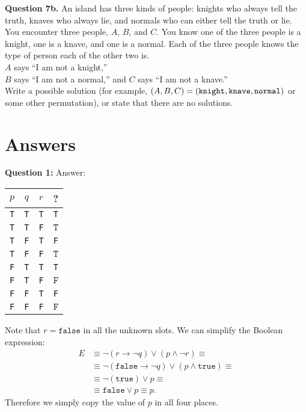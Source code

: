 \documentclass[jou]{apa6}
\begin{document}
\vspace{10pt}
{\bf Question 7b.} 
An island has three kinds of people: knights who always
tell the truth, knaves who always lie, and normals who can either tell the truth or lie. 
You encounter three people, $A$, $B$, and $C$. 
You know one of the three people is a knight, one is a knave, and one is a normal. Each of the three
people knows the type of person each of the other two is.\\
$A$ says ``I am not a knight,''\\
$B$ says ``I am not a normal,'' and 
$C$ says ``I am not a knave.''\\
Write a possible solution (for example, $(A,B,C)=({\tt knight},{\tt knave},{\tt normal})$ or 
some other permutation), or state that there are no solutions.


\newpage 

\section{Answers}


{\bf Question 1:} Answer:

\begin{tabular}{ c | c | c | c }
$p$ & $q$ & $r$ & ? \\ \hline
{\tt T} & {\tt T} & {\tt T} & {\tt T} \\ \hline
{\tt T} & {\tt T} & {\tt F} & $\boxed{\mathtt{T}}$ \\ \hline
{\tt T} & {\tt F} & {\tt T} & {\tt F} \\ \hline
{\tt T} & {\tt F} & {\tt F} & $\boxed{\mathtt{T}}$ \\ \hline
{\tt F} & {\tt T} & {\tt T} & {\tt T} \\ \hline
{\tt F} & {\tt T} & {\tt F} & $\boxed{\mathtt{F}}$ \\ \hline
{\tt F} & {\tt F} & {\tt T} & {\tt F} \\ \hline
{\tt F} & {\tt F} & {\tt F} & $\boxed{\mathtt{F}}$ \\ \hline
\end{tabular}

\vspace{3pt}
\noindent
Note that $r=\mathtt{false}$ in all the unknown slots. 
We can simplify the Boolean expression:
\begin{align}
E & \equiv \neg(r \rightarrow \neg q) \vee (p \wedge \neg r) \equiv \nonumber \\
  & \equiv \neg(\mathtt{false} \rightarrow \neg q) \vee 
(p \wedge \mathtt{true}) \equiv  \nonumber \\
  & \equiv \neg(\mathtt{true}) \vee p \equiv \nonumber \\
  & \equiv \mathtt{false} \vee p \equiv p. \nonumber
\end{align}
Therefore we simply copy the value of $p$ in all four places.
\end{document}
